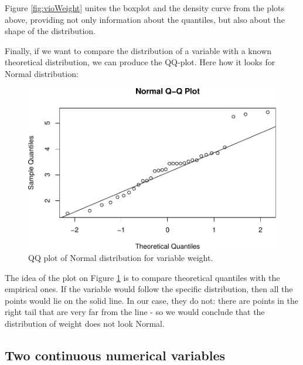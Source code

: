 \documentclass[
]{book}
\newenvironment{Shaded}{\begin{snugshade}}{\end{snugshade}}
\newcommand{\KeywordTok}[1]{\textcolor[rgb]{0.13,0.29,0.53}{\textbf{#1}}}
\newcommand{\NormalTok}[1]{#1}
\newcommand{\OperatorTok}[1]{\textcolor[rgb]{0.81,0.36,0.00}{\textbf{#1}}}
\theoremstyle{definition}
\theoremstyle{definition}
\theoremstyle{definition}
\theoremstyle{definition}
\theoremstyle{remark}
\begin{document}
Figure \ref{fig:vioWeight} unites the boxplot and the density curve from the plots above, providing not only information about the quantiles, but also about the shape of the distribution.

Finally, if we want to compare the distribution of a variable with a known theoretical distribution, we can produce the QQ-plot. Here how it looks for Normal distribution:

\begin{Shaded}
\end{Shaded}

\begin{figure}
\centering
\includegraphics{Svetunkov---Statistics-for-Business-Analytics_files/figure-latex/QQWeight-1.pdf}
\caption{\label{fig:QQWeight}QQ plot of Normal distribution for variable weight.}
\end{figure}

The idea of the plot on Figure \ref{fig:QQWeight} is to compare theoretical quantiles with the empirical ones. If the variable would follow the specific distribution, then all the points would lie on the solid line. In our case, they do not: there are points in the right tail that are very far from the line - so we would conclude that the distribution of weight does not look Normal.

\hypertarget{two-continuous-numerical-variables}{%
\subsection{Two continuous numerical variables}\label{two-continuous-numerical-variables}}
\end{document}
